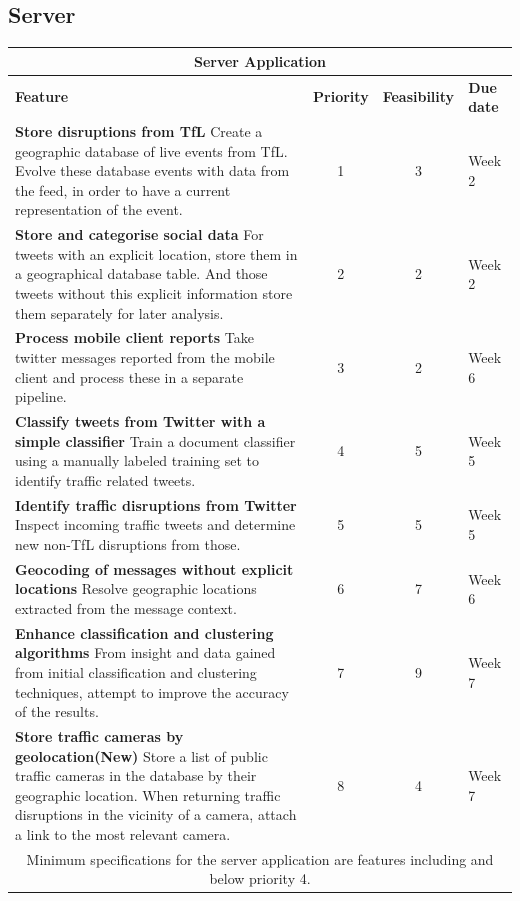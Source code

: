 \subsection{Server}

\begin{center}
\begin{tabular}{ | p{9cm} | c | c | p{1.8cm} | }
\hline
\multicolumn{4}{|c|}{\textbf{Server Application}} \\ \hline
\textbf{Feature} & \textbf{Priority} & \textbf{Feasibility} & \textbf{Due date}
\\ \hline
\textbf{Store disruptions from TfL} \newline
Create a geographic database of live events from TfL. Evolve these database events with data from the feed, in order to have a current representation of the event. & 1 & 3 & Week 2 \\ \hline
\textbf{Store and categorise social data} \newline
For tweets with an explicit location, store them in a geographical database
table. And those tweets without this explicit information store them separately for later
analysis. & 2 & 2 & Week 2 \\ \hline
\textbf{Process mobile client reports} \newline
Take twitter messages reported from the mobile client and process these in a
separate pipeline. & 3 & 2 & Week 6 \\ \hline
\textbf{Classify tweets from Twitter with a simple classifier} \newline
Train a document classifier using a manually labeled training set to 
identify traffic related tweets. & 4 & 5 & Week 5 \\ \hline \hline
\textbf{Identify traffic disruptions from Twitter} \newline
Inspect incoming traffic tweets and determine new non-TfL disruptions from
those. & 5 & 5 & Week 5 \\ \hline
\textbf{Geocoding of messages without explicit locations} \newline
Resolve geographic locations extracted from the message context. & 6 & 7 & Week 6 \\ \hline
\textbf{Enhance classification and clustering algorithms} \newline
From insight and data gained from initial classification and clustering
techniques, attempt to improve the accuracy of the results. & 7 & 9 & Week 7 \\ \hline
\textbf{Store traffic cameras by geolocation(New)}\newline
Store a list of public traffic cameras in the database by their geographic
location. When returning traffic disruptions in the vicinity of a camera,
attach a link to the most relevant camera. &  8 &  4 & Week 7 \\ \hline
\multicolumn{4}{|c|}{Minimum specifications for the server application are
features including and below priority 4.} \\ \hline
\end{tabular}
\end{center}

